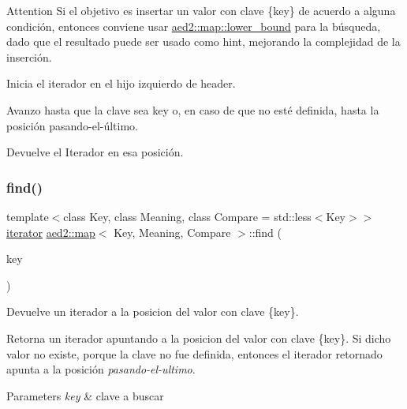 \begin{DoxyAttention}{Attention}
Si el objetivo es insertar un valor con clave \{key\} de acuerdo a alguna condición, entonces conviene usar \hyperlink{classaed2_1_1map_a62075a47afdf89267c5462f88164af3d}{aed2\+::map\+::lower\+\_\+bound} para la búsqueda, dado que el resultado puede ser usado como hint, mejorando la complejidad de la inserción.
\begin{DoxyItemize}
\item Inicia el iterador en el hijo izquierdo de header.
\item Avanzo hasta que la clave sea key o, en caso de que no esté definida, hasta la posición pasando-\/el-\/último.
\item Devuelve el Iterador en esa posición. 
\end{DoxyItemize}
\end{DoxyAttention}
\mbox{\label{classaed2_1_1map_afd0fc1a8234888e61e0e615de7e245b8}} 
\subsubsection{\texorpdfstring{find()}{find()}\hspace{0.1cm}{\footnotesize\ttfamily [2/4]}}
{\footnotesize\ttfamily template$<$class Key, class Meaning, class Compare = std\+::less$<$\+Key$>$$>$ \\
\hyperlink{classaed2_1_1map_1_1iterator}{iterator} \hyperlink{classaed2_1_1map}{aed2\+::map}$<$ Key, Meaning, Compare $>$\+::find (\begin{DoxyParamCaption}\item[{const Key \&}]{key }\end{DoxyParamCaption})\hspace{0.3cm}{\ttfamily [inline]}}



Devuelve un iterador a la posicion del valor con clave \{key\}. 

Retorna un iterador apuntando a la posicion del valor con clave \{key\}. Si dicho valor no existe, porque la clave no fue definida, entonces el iterador retornado apunta a la posición {\itshape pasando-\/el-\/ultimo}.


\begin{DoxyParams}{Parameters}
{\em key} & clave a buscar \\
\hline
\end{DoxyParams}

